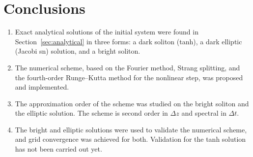 \documentclass{article}
\begin{document}
    \section{Conclusions}
    \begin{enumerate}
        \item Exact analytical solutions of the initial system were found in Section~\ref{sec:analytical} in three forms: a dark soliton (tanh), a dark elliptic (Jacobi sn) solution, and a bright soliton.
        \item The numerical scheme, based on the Fourier method, Strang splitting, and the fourth-order Runge–Kutta method for the nonlinear step, was proposed and implemented.
        \item The approximation order of the scheme was studied on the bright soliton and the elliptic solution. The scheme is second order in \(\Delta z\) and spectral in \(\Delta t\).
        \item The bright and elliptic solutions were used to validate the numerical scheme, and grid convergence was achieved for both. Validation for the tanh solution has not been carried out yet.
    \end{enumerate}
\end{document}
